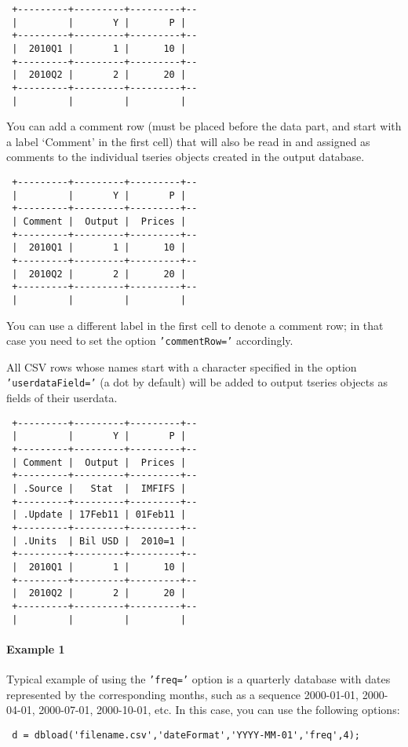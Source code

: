  \begin{verbatim}
 +---------+---------+---------+--
 |         |       Y |       P |
 +---------+---------+---------+--
 |  2010Q1 |       1 |      10 |
 +---------+---------+---------+--
 |  2010Q2 |       2 |      20 |
 +---------+---------+---------+--
 |         |         |         |
 \end{verbatim}
 
 You can add a comment row (must be placed before the data part, and
 start with a label `Comment' in the first cell) that will also be read
 in and assigned as comments to the individual tseries objects created in
 the output database.
 
 \begin{verbatim}
 +---------+---------+---------+--
 |         |       Y |       P |
 +---------+---------+---------+--
 | Comment |  Output |  Prices |
 +---------+---------+---------+--
 |  2010Q1 |       1 |      10 |
 +---------+---------+---------+--
 |  2010Q2 |       2 |      20 |
 +---------+---------+---------+--
 |         |         |         |
 \end{verbatim}
 
 You can use a different label in the first cell to denote a comment row;
 in that case you need to set the option \texttt{'commentRow='}
 accordingly.
 
 All CSV rows whose names start with a character specified in the option
 \texttt{'userdataField='} (a dot by default) will be added to output
 tseries objects as fields of their userdata.
 
 \begin{verbatim}
 +---------+---------+---------+--
 |         |       Y |       P |
 +---------+---------+---------+--
 | Comment |  Output |  Prices |
 +---------+---------+---------+--
 | .Source |   Stat  |  IMFIFS |
 +---------+---------+---------+--
 | .Update | 17Feb11 | 01Feb11 |
 +---------+---------+---------+--
 | .Units  | Bil USD |  2010=1 |
 +---------+---------+---------+--
 |  2010Q1 |       1 |      10 |
 +---------+---------+---------+--
 |  2010Q2 |       2 |      20 |
 +---------+---------+---------+--
 |         |         |         |
 \end{verbatim}
 
 \paragraph{Example 1}
 
 Typical example of using the \texttt{'freq='} option is a quarterly
 database with dates represented by the corresponding months, such as a
 sequence 2000-01-01, 2000-04-01, 2000-07-01, 2000-10-01, etc. In this
 case, you can use the following options:
 
 \begin{verbatim}
 d = dbload('filename.csv','dateFormat','YYYY-MM-01','freq',4);
 \end{verbatim}


